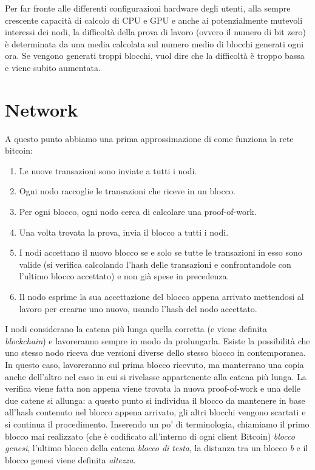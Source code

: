 Per far fronte alle differenti configurazioni hardware degli utenti,
alla sempre crescente capacità di calcolo di CPU e GPU e anche ai
potenzialmente mutevoli interessi dei nodi, la difficoltà della prova di
lavoro (ovvero il numero di bit zero) è determinata da una media
calcolata sul numero medio di blocchi generati ogni ora. Se vengono
generati troppi blocchi, vuol dire che la difficoltà è troppo bassa e
viene subito aumentata.

\section{Network}\label{network}

A questo punto abbiamo una prima approssimazione di come funziona la
rete bitcoin:

\begin{enumerate}
\def\labelenumi{\arabic{enumi}.}
\itemsep1pt\parskip0pt
\item
  Le nuove transazioni sono inviate a tutti i nodi.
\item
  Ogni nodo raccoglie le transazioni che riceve in un blocco.
\item
  Per ogni blocco, ogni nodo cerca di calcolare una proof-of-work.
\item
  Una volta trovata la prova, invia il blocco a tutti i nodi.
\item
  I nodi accettano il nuovo blocco se e solo se tutte le transazioni in
  esso sono valide (si verifica calcolando l'hash delle transazioni e
  confrontandole con l'ultimo blocco accettato) e non già spese in
  precedenza.
\item
  Il nodo esprime la sua accettazione del blocco appena arrivato
  mettendosi al lavoro per crearne uno nuovo, usando l'hash del nodo
  accettato.
\end{enumerate}

I nodi considerano la catena più lunga quella corretta (e viene definita
\emph{blockchain}) e lavoreranno sempre in modo da prolungarla. Esiste
la possibilità che uno stesso nodo riceva due versioni diverse dello
stesso blocco in contemporanea. In questo caso, lavoreranno sul prima
blocco ricevuto, ma manterrano una copia anche dell'altro nel caso in
cui si rivelasse appartenente alla catena più lunga. La verifica viene
fatta non appena viene trovata la nuova proof-of-work e una delle due
catene si allunga: a questo punto si individua il blocco da mantenere in
base all'hash contenuto nel blocco appena arrivato, gli altri blocchi
vengono scartati e si continua il procedimento. Inserendo un po' di
terminologia, chiamiamo il primo blocco mai realizzato (che è codificato
all'interno di ogni client Bitcoin) \emph{blocco genesi}, l'ultimo
blocco della catena \emph{blocco di testa}, la distanza tra un blocco
\emph{b} e il blocco genesi viene definita \emph{altezza}.

